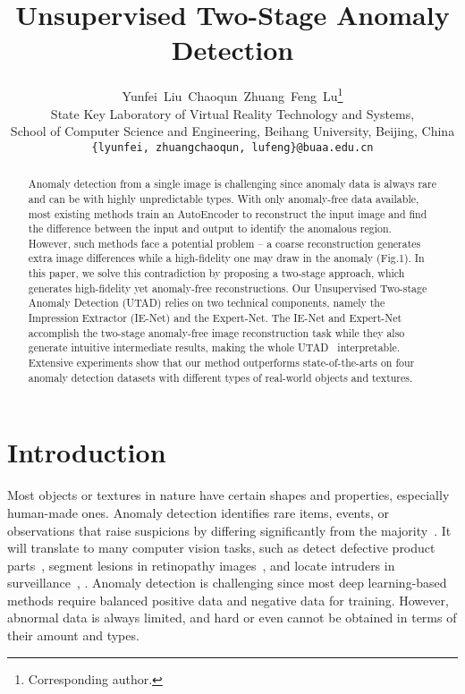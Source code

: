 \documentclass[final]{cvpr}
\newcommand{\proposed}{UTAD}
\begin{document}
\title{Unsupervised Two-Stage Anomaly Detection}



\author{Yunfei~Liu\quad\quad~Chaoqun~Zhuang\quad\quad~Feng~Lu\thanks{ Corresponding author. }\\
State Key Laboratory of Virtual Reality Technology and Systems, \\
School of Computer Science and Engineering, Beihang University, Beijing, China  \\
\small{\texttt{\{lyunfei, zhuangchaoqun, lufeng\}@buaa.edu.cn}}
}

\maketitle

\begin{abstract}
   
    Anomaly detection from a single image is challenging since anomaly data is always rare and can be with highly unpredictable types. With only anomaly-free data available, most existing methods train an AutoEncoder to reconstruct the input image and find the difference between the input and output to identify the anomalous region. However, such methods face a potential problem – a coarse reconstruction generates extra image differences while a high-fidelity one may draw in the anomaly (Fig.1). In this paper, we solve this contradiction by proposing a two-stage approach, which generates high-fidelity yet anomaly-free reconstructions. Our Unsupervised Two-stage Anomaly Detection (\proposed) relies on two technical components, namely the Impression Extractor (IE-Net) and the Expert-Net. The IE-Net and Expert-Net accomplish the two-stage anomaly-free image reconstruction task
while they also generate intuitive intermediate results, making the whole \proposed~ interpretable. Extensive experiments show that our method outperforms state-of-the-arts on four anomaly detection datasets with different types of real-world objects and textures.
 
 
\end{abstract}



\section{Introduction}

Most objects or textures in nature have certain shapes and properties, especially human-made ones. Anomaly detection identifies rare items, events, or observations that raise suspicions by differing significantly from the majority~\cite{A:arthur2016outlier}.
It will translate to many computer vision tasks, such as detect defective product parts~\cite{A:bergmann2019mvtec}, segment lesions in retinopathy images~\cite{A:niu2019pathological}, and locate intruders in surveillance~\cite{A:nguyen2018weakly}, \etc.
Anomaly detection is challenging since most deep learning-based methods require balanced positive data and negative data for training. However, abnormal data is always limited, and hard or even cannot be obtained in terms of their amount and types. 
\end{document}
